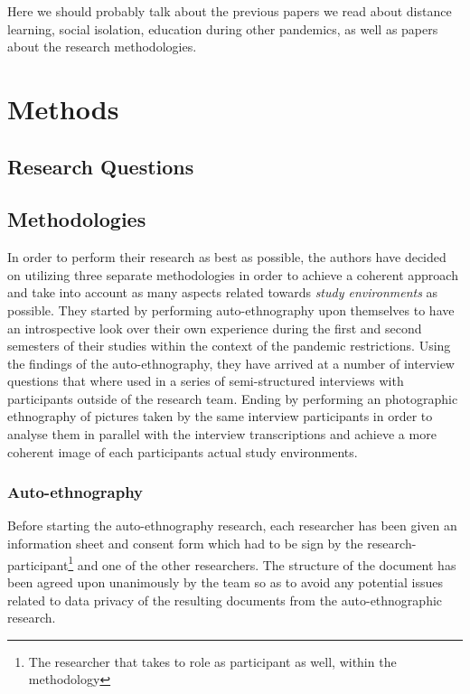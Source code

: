 \documentclass{sigchi}
\begin{document}
Here we should probably talk about the previous papers we read about distance learning, social isolation, education during other pandemics, as well as papers about the research methodologies.

\section{Methods}

\subsection{Research Questions}


\subsection{Methodologies}
In order to perform their research as best as possible, the authors have decided on utilizing three separate methodologies in order to achieve a coherent approach and take into account as many aspects related towards \emph{study environments} as possible. They started by performing auto-ethnography upon themselves to have an introspective look over their own experience during the first and second semesters of their studies within the context of the pandemic restrictions. Using the findings of the auto-ethnography, they have arrived at a number of interview questions that where used in a series of semi-structured interviews with participants outside of the research team. Ending by performing an photographic ethnography of pictures taken by the same interview participants in order to analyse them in parallel with the interview transcriptions and achieve a more coherent image of each participants actual study environments.

\subsubsection{Auto-ethnography}

Before starting the auto-ethnography research, each researcher has been given an information sheet and consent form which had to be sign by the research-participant\footnote{The researcher that takes to role as participant as well, within the methodology} and one of the other researchers. The structure of the document has been agreed upon unanimously by the team so as to avoid any potential issues related to data privacy of the resulting documents from the auto-ethnographic research.
\end{document}
